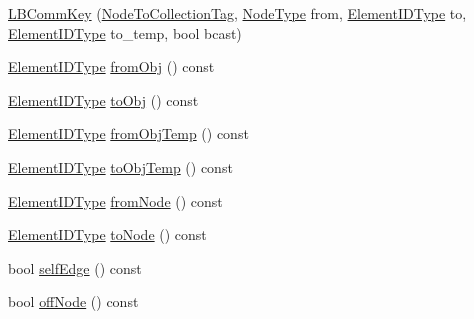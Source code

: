 \begin{DoxyCompactItemize}
\item 
\hyperlink{structvt_1_1vrt_1_1collection_1_1balance_1_1_l_b_comm_key_a2f9a95d4de4d824ba4dbdec5eb5317b7}{L\+B\+Comm\+Key} (\hyperlink{structvt_1_1vrt_1_1collection_1_1balance_1_1_l_b_comm_key_1_1_node_to_collection_tag}{Node\+To\+Collection\+Tag}, \hyperlink{namespacevt_a866da9d0efc19c0a1ce79e9e492f47e2}{Node\+Type} from, \hyperlink{namespacevt_1_1vrt_1_1collection_1_1balance_a14c8d2c972f2913aa3f1636e5be0a120}{Element\+I\+D\+Type} to, \hyperlink{namespacevt_1_1vrt_1_1collection_1_1balance_a14c8d2c972f2913aa3f1636e5be0a120}{Element\+I\+D\+Type} to\+\_\+temp, bool bcast)
\item 
\hyperlink{namespacevt_1_1vrt_1_1collection_1_1balance_a14c8d2c972f2913aa3f1636e5be0a120}{Element\+I\+D\+Type} \hyperlink{structvt_1_1vrt_1_1collection_1_1balance_1_1_l_b_comm_key_ae2e02eab3d0ec33e439713e26441cd6b}{from\+Obj} () const
\item 
\hyperlink{namespacevt_1_1vrt_1_1collection_1_1balance_a14c8d2c972f2913aa3f1636e5be0a120}{Element\+I\+D\+Type} \hyperlink{structvt_1_1vrt_1_1collection_1_1balance_1_1_l_b_comm_key_a56a3f51e34f36bb62423dd0c035b5971}{to\+Obj} () const
\item 
\hyperlink{namespacevt_1_1vrt_1_1collection_1_1balance_a14c8d2c972f2913aa3f1636e5be0a120}{Element\+I\+D\+Type} \hyperlink{structvt_1_1vrt_1_1collection_1_1balance_1_1_l_b_comm_key_ab8f8acdc0ff24784dfe4d6fafcc1205c}{from\+Obj\+Temp} () const
\item 
\hyperlink{namespacevt_1_1vrt_1_1collection_1_1balance_a14c8d2c972f2913aa3f1636e5be0a120}{Element\+I\+D\+Type} \hyperlink{structvt_1_1vrt_1_1collection_1_1balance_1_1_l_b_comm_key_a283c2e80183c3d37303f9b64a8097b66}{to\+Obj\+Temp} () const
\item 
\hyperlink{namespacevt_1_1vrt_1_1collection_1_1balance_a14c8d2c972f2913aa3f1636e5be0a120}{Element\+I\+D\+Type} \hyperlink{structvt_1_1vrt_1_1collection_1_1balance_1_1_l_b_comm_key_ae4d718ec81cafb4e830c5c9785baf070}{from\+Node} () const
\item 
\hyperlink{namespacevt_1_1vrt_1_1collection_1_1balance_a14c8d2c972f2913aa3f1636e5be0a120}{Element\+I\+D\+Type} \hyperlink{structvt_1_1vrt_1_1collection_1_1balance_1_1_l_b_comm_key_a159cf93a19b8a3fad2e4cfee94f96c83}{to\+Node} () const
\item 
bool \hyperlink{structvt_1_1vrt_1_1collection_1_1balance_1_1_l_b_comm_key_aa1fd1503a2c6d034bf329a1af7ca911a}{self\+Edge} () const
\item 
bool \hyperlink{structvt_1_1vrt_1_1collection_1_1balance_1_1_l_b_comm_key_a77c270338ac89fa8f31457f0b22f1230}{off\+Node} () const

\end{DoxyCompactItemize}
